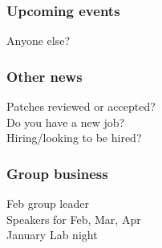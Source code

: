 \documentclass{beamer}
\begin{document}
\frame
{
  \frametitle{Upcoming events}
  \begin{center}
Anyone else?
  \end{center}
}

\frame
{
  \frametitle{Other news}
  \begin{center}
Patches reviewed or accepted?\\
Do you have a new job?\\
Hiring/looking to be hired?\\
  \end{center}
}

\frame
{
  \frametitle{Group business}
  \begin{center}
Feb group leader\\
Speakers for Feb, Mar, Apr\\
January Lab night
  \end{center}
}
\end{document}
